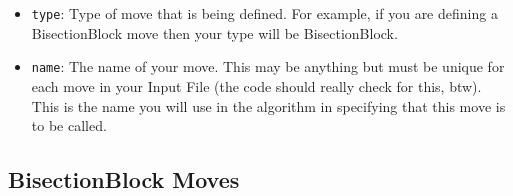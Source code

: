 \documentclass{book}
\begin{document}
\begin{itemize}
   \item \texttt{type}:  Type of move that is being
   defined.  For example, if you are defining a BisectionBlock move
   then your type will be BisectionBlock.

   \item \texttt{name}:  The name of your move. This may be anything
   but must be unique for each move in your Input File (the code should
   really check for this, btw).  This is the name you will use in the
   algorithm in specifying that this move is to be called.

\end{itemize}

\subsection{BisectionBlock Moves}
 
\end{document}
